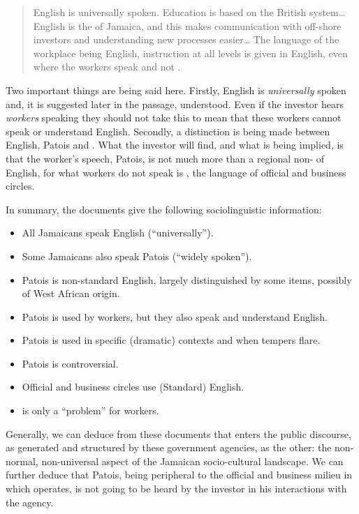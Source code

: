 \begin{quote}
	English is universally spoken.  Education is based on the British system\ldots\xspace English is the  of Jamaica, and this makes communication with off-shore investors and understanding new processes easier\ldots\xspace The language of the workplace being English, instruction at all levels is given in English, even where the workers speak  and not  \citep{JAMPRO1992}.
\end{quote}

  Two important things are being said here.  Firstly, English is \textit{universally} spoken and, it is suggested later in the passage, understood.  Even if the investor hears \textit{workers} speaking  they should not take this to mean that these workers cannot speak or understand English.  Secondly, a distinction is being made between English, Patois and .  What the investor will find, and what is being implied, is that the worker’s speech, Patois, is not much more than a regional non- of English, for what workers do not speak is , the language of official and business circles.  

In summary, the  documents give the following sociolinguistic information:

\begin{itemize}
\item All Jamaicans speak English (“universally”).
\item Some Jamaicans also speak Patois (“widely spoken”).
\item Patois is non-standard English, largely distinguished by some items, possibly of West African origin.
\item Patois is used by workers, but they also speak and understand English.
\item Patois is used in specific (dramatic) contexts and when tempers flare.
\item Patois is controversial.
\item Official and business circles use (Standard) English.
\item {} is only a “problem” for workers.
\end{itemize}

  Generally, we can deduce from these documents that  enters the public discourse, as generated and structured by these government agencies, as the other: the non-normal, non-universal aspect of the Jamaican socio-cultural landscape.  We can further deduce that Patois, being peripheral to the official and business milieu in which  operates, is not going to be heard by the investor in his interactions with the agency. 

